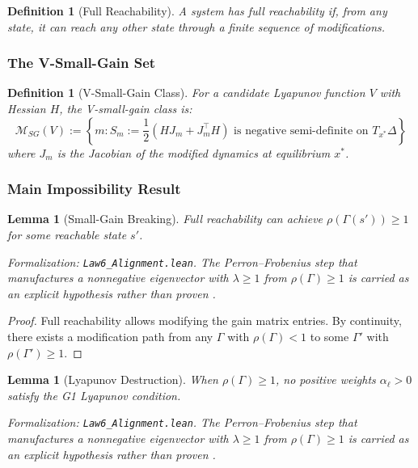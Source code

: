 \documentclass[12pt]{article}
\newtheorem{lemma}[theorem]{Lemma}
\newtheorem{definition}[theorem]{Definition}
\begin{document}
\begin{definition}[Full Reachability]
A system has \emph{full reachability} if, from any state, it can reach any other state through a finite sequence of modifications.
\end{definition}

\subsubsection{The V-Small-Gain Set}

\begin{definition}[V-Small-Gain Class]
For a candidate Lyapunov function $V$ with Hessian $H$, the \emph{V-small-gain class} is:
\[
\mathcal{M}_{SG}(V) := \left\{ m : S_m := \frac{1}{2}(H J_m + J_m^\top H) \text{ is negative semi-definite on } T_{x^*}\Delta \right\}
\]
where $J_m$ is the Jacobian of the modified dynamics at equilibrium $x^*$.
\end{definition}

\subsubsection{Main Impossibility Result}

\begin{lemma}[Small-Gain Breaking]
\label{lem:sg-breaking}
Full reachability can achieve $\rho(\Gamma(s')) \geq 1$ for some reachable state $s'$.
\end{lemma}
\noindent\textit{Formalization: \texttt{Law6\_Alignment.lean}. The Perron--Frobenius step that manufactures a nonnegative eigenvector with $\lambda \geq 1$ from $\rho(\Gamma) \geq 1$ is carried as an explicit hypothesis rather than proven \citep{horn2012matrix}.}

\begin{proof}
Full reachability allows modifying the gain matrix entries. By continuity, there exists a modification path from any $\Gamma$ with $\rho(\Gamma) < 1$ to some $\Gamma'$ with $\rho(\Gamma') \geq 1$.
\end{proof}

\begin{lemma}[Lyapunov Destruction]
\label{lem:lyap-destruction}
When $\rho(\Gamma) \geq 1$, no positive weights $\alpha_\ell > 0$ satisfy the G1 Lyapunov condition.
\end{lemma}
\noindent\textit{Formalization: \texttt{Law6\_Alignment.lean}. The Perron--Frobenius step that manufactures a nonnegative eigenvector with $\lambda \geq 1$ from $\rho(\Gamma) \geq 1$ is carried as an explicit hypothesis rather than proven \citep{horn2012matrix}.}
\end{document}
